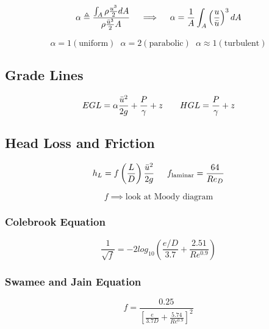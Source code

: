 \documentclass[twocolumn, 12pt]{article}
\begin{document}
{\begin{equation*}
    \alpha \triangleq \frac{\int_A \rho \frac{u^3}{2}dA}{\rho \frac{\Bar{u}^3}{2}A} \hspace{10pt} \implies \hspace{10pt} \alpha = \frac{1}{A}\int_A \left(\frac{u}{\Bar{u}}\right)^3dA
\end{equation*}


\begin{equation*}
    \alpha = 1 (\text{uniform}) \hspace{7pt} \alpha = 2 (\text{parabolic}) \hspace{7pt} \alpha \approx 1 (\text{turbulent})
\end{equation*}


\subsection*{Grade Lines}
\begin{equation*}
    EGL = \alpha \frac{\Bar{u}^2}{2g} +\frac{P}{\gamma} +z \hspace{20pt}   HGL = \frac{P}{\gamma} +z
\end{equation*}




%
\subsection*{Head Loss and Friction}
\begin{equation*}
 h_L = f \left(\frac{L}{D}\right)\frac{\Bar{u}^2}{2g} \hspace{15pt} f_{\text{laminar}} = \frac{64}{Re_D}
\end{equation*}

\begin{equation*}
    f \implies \text{look at Moody diagram}
\end{equation*}

\subsubsection*{Colebrook Equation}
\begin{equation*}
    \frac{1}{\sqrt{f}} = -2log_{10} \left( \frac{e/D}{3.7} + \frac{2.51}{Re^{0.9}}\right)
\end{equation*}

\subsubsection*{Swamee and Jain Equation}
\begin{equation*}
    f  = \frac{0.25}{\left[ \frac{e}{3.7D} +\frac{5.74}{Re^{0.9}} \right]^2}
\end{equation*}


}
\end{document}
